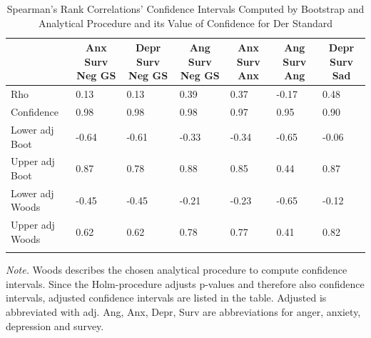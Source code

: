 \documentclass[
  english,
  jou,floatsintext]{apa7}
\begin{document}
\begin{table}[tbp]

\begin{center}
\begin{threeparttable}

\caption{\label{tab:table-appendix-2}Spearman's Rank Correlations' Confidence Intervals Computed by Bootstrap and Analytical Procedure and its Value of Confidence for Der Standard}

\small{

\begin{tabular}{lllllll}
\toprule
 & \multicolumn{1}{c}{Anx Surv Neg GS} & \multicolumn{1}{c}{Depr Surv Neg GS} & \multicolumn{1}{c}{Ang Surv Neg GS} & \multicolumn{1}{c}{Anx Surv Anx} & \multicolumn{1}{c}{Ang Surv Ang} & \multicolumn{1}{c}{Depr Surv Sad}\\
\midrule
Rho & 0.13 & 0.13 & 0.39 & 0.37 & -0.17 & 0.48\\
Confidence & 0.98 & 0.98 & 0.98 & 0.97 & 0.95 & 0.90\\
Lower adj Boot & -0.64 & -0.61 & -0.33 & -0.34 & -0.65 & -0.06\\
Upper adj Boot & 0.87 & 0.78 & 0.88 & 0.85 & 0.44 & 0.87\\
Lower adj Woods & -0.45 & -0.45 & -0.21 & -0.23 & -0.65 & -0.12\\
Upper adj Woods & 0.62 & 0.62 & 0.78 & 0.77 & 0.41 & 0.82\\
\bottomrule
\addlinespace
\end{tabular}

}

\begin{tablenotes}[para]
\normalsize{\textit{Note.} Woods describes the chosen analytical procedure to compute confidence intervals. Since the Holm-procedure adjusts p-values and therefore also confidence intervals, adjusted confidence intervals are listed in the table. Adjusted is abbreviated with adj. Ang, Anx, Depr, Surv are abbreviations for anger, anxiety, depression and survey.}
\end{tablenotes}

\end{threeparttable}
\end{center}

\end{table}
\end{document}
